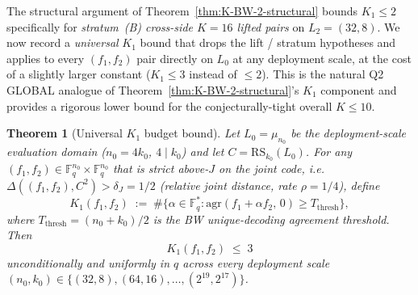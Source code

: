 \documentclass[11pt]{article}
\newtheorem{theorem}{Theorem}[section]
\theoremstyle{definition}
\theoremstyle{remark}
\newcommand{\FF}{\mathbb{F}}
\begin{document}
\noindent The structural argument of
Theorem~\ref{thm:K-BW-2-structural} bounds $K_1 \leq 2$ specifically for
\emph{stratum~(B) cross-side $K = 16$ lifted pairs} on $L_2 = (32, 8)$.
We now record a \emph{universal} $K_1$ bound that drops the lift /
stratum hypotheses and applies to every $(f_1, f_2)$ pair directly on
$L_0$ at any deployment scale, at the cost of a slightly larger constant
($K_1 \leq 3$ instead of $\leq 2$). This is the natural Q2 GLOBAL
analogue of Theorem~\ref{thm:K-BW-2-structural}'s $K_1$ component and
provides a rigorous lower bound for the conjecturally-tight overall
$K \leq 10$.

\begin{theorem}[Universal $K_1$ budget bound]
\label{thm:K1-universal-budget}
Let $L_0 = \mu_{n_0}$ be the deployment-scale evaluation domain
($n_0 = 4 k_0$, $4 \mid k_0$) and let $C = \mathrm{RS}_{k_0}(L_0)$. For
\emph{any} $(f_1, f_2) \in \FF_q^{n_0} \times \FF_q^{n_0}$ that is
strict above-$J$ on the joint code, i.e.\
$\Delta((f_1, f_2), C^2) > \delta_J = 1/2$ (relative joint distance, rate $\rho = 1/4$), define
\[
 K_1(f_1, f_2)
 \;:=\; \#\bigl\{\alpha \in \FF_q^* :
   \mathrm{agr}(f_1 + \alpha f_2,\, 0) \geq T_{\mathrm{thresh}}\bigr\},
\]
where $T_{\mathrm{thresh}} = (n_0 + k_0)/2$ is the BW unique-decoding
agreement threshold. Then
\[
 \boxed{\quad K_1(f_1, f_2) \;\leq\; 3 \quad}
\]
unconditionally and uniformly in $q$ across every deployment scale
$(n_0, k_0) \in \{(32, 8), (64, 16), \ldots, (2^{19}, 2^{17})\}$.
\end{theorem}
\end{document}
